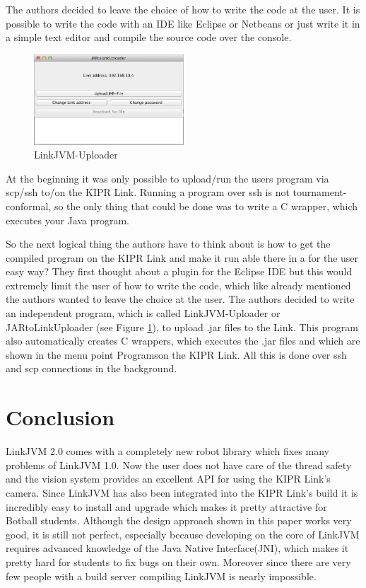 \documentclass{juniorjournal}
\begin{document}
The authors decided to leave the choice of how to write the code at the user. It 
is possible to write the code with an IDE like Eclipse or Netbeans or just write 
it in a simple text editor and compile the source code over the console.

\begin{figure}[H]
\centering
\includegraphics[width=0.5\textwidth]{images/linkjvm_uploader.jpg}
\caption{LinkJVM-Uploader}
\label{fig:linkjvm_uploader}
\end{figure}

At the beginning it was only possible to upload/run the users program via scp/ssh to/on the KIPR\cite{KIPR} Link\cite{link}.
Running a program over ssh is not tournament-conformal, so the only thing that could be done 
was to write a C wrapper, which executes your Java\cite{Java} program.

So the next logical thing the authors have to think about is how to get the compiled 
program on the KIPR\cite{KIPR} Link\cite{link} and make it run able there in a for the user easy way?
They first thought about a plugin for the Eclipse IDE but this would extremely 
limit the user of how to write the code, which like already mentioned the 
authors wanted to leave the choice at the user.
The authors decided to write an independent program, which is called 
LinkJVM-Uploader or JARtoLinkUploader (see Figure \ref{fig:linkjvm_uploader}), 
to upload .jar files to the Link\cite{link}. This program also automatically creates C 
wrappers, which executes the .jar files and which are shown in the menu point 
\frqq Programs\flqq  on the KIPR\cite{KIPR} Link\cite{link}. All this is done over ssh and scp connections in 
the background.

\section{Conclusion}
LinkJVM 2.0 comes with a completely new robot library which fixes many problems of LinkJVM 1.0\cite{linkjvm1.0}.
Now the user does not have care of the thread safety and the vision system provides an excellent API for using the KIPR\cite{KIPR} Link's\cite{link} camera. 
Since LinkJVM has also been integrated into the KIPR\cite{KIPR} Link's\cite{link} build it is incredibly easy to install and upgrade which makes it pretty attractive for Botball students.
Although the design approach shown in this paper works very good, it is still not perfect,
especially because developing on the core of LinkJVM requires advanced knowledge 
of the Java\cite{Java} Native Interface(JNI), which makes it pretty hard for students to fix bugs on their own.
Moreover since there are very few people with a build server compiling LinkJVM is nearly impossible.
\end{document}
